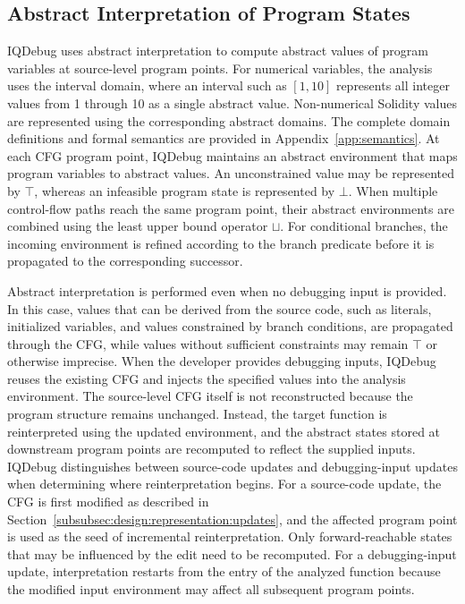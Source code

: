 \documentclass[11pt,oneside]{report}
\theoremstyle{plain}
\theoremstyle{definition}
\theoremstyle{remark}
\begin{document}
\subsection{Abstract Interpretation of Program States}\label{subsec:design:ai}
IQDebug uses abstract interpretation to compute abstract values of program variables at source-level program points.
For numerical variables, the analysis uses the interval domain, where an interval such as \([1,10]\) represents all integer values from 1 through 10 as a single abstract value.
Non-numerical Solidity values are represented using the corresponding abstract domains.
The complete domain definitions and formal semantics are provided in Appendix~\ref{app:semantics}.
At each CFG program point, IQDebug maintains an abstract environment that maps program variables to abstract values.
An unconstrained value may be represented by \(\top\), whereas an infeasible program state is represented by \(\bot\).
When multiple control-flow paths reach the same program point, their abstract environments are combined using the least upper bound operator \(\sqcup\).
For conditional branches, the incoming environment is refined according to the branch predicate before it is propagated to the corresponding successor.

Abstract interpretation is performed even when no debugging input is provided.
In this case, values that can be derived from the source code, such as literals, initialized variables, and values constrained by branch conditions, are propagated through the CFG, while values without sufficient constraints may remain \(\top\) or otherwise imprecise.
When the developer provides debugging inputs, IQDebug reuses the existing CFG and injects the specified values into the analysis environment.
The source-level CFG itself is not reconstructed because the program structure remains unchanged.
Instead, the target function is reinterpreted using the updated environment, and the abstract states stored at downstream program points are recomputed to reflect the supplied inputs.
IQDebug distinguishes between source-code updates and debugging-input updates when determining where reinterpretation begins.
For a source-code update, the CFG is first modified as described in Section~\ref{subsubsec:design:representation:updates}, and the affected program point is used as the seed of incremental reinterpretation.
Only forward-reachable states that may be influenced by the edit need to be recomputed.
For a debugging-input update, interpretation restarts from the entry of the analyzed function because the modified input environment may affect all subsequent program points.
\end{document}
